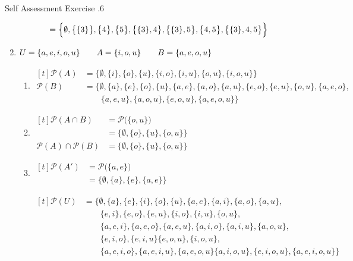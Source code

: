 \documentclass[../notes.tex]{subfiles}
\begin{document}
\begin{exercise}{Self Assessment Exercise \thechapter.6}
\begin{enumerate}
\begin{align*}
							&= \Bigl\{\emptyset, \bigl\{\{3\}\bigr\}, \bigl\{4\bigr\}, \bigl\{5\bigr\}, \bigl\{\{3\}, 4\bigr\}, \bigl\{\{3\}, 5\bigr\}, \bigl\{4, 5\bigr\}, \bigl\{\{3\}, 4, 5\bigr\}\Bigr\}
						\end{align*}
					\pagebreak
					\item \hfill $
						\begin{alignedat}[t]{3}
							U &= \{a, e, i, o, u\} \qquad & A &= \{i, o, u\} \qquad & B &= \{a, e, o, u\}
						\end{alignedat} $ \hfill \phantom{4 \quad}
						\begin{enumerate}[label=(\alph*), labelsep=1em]
							\item $
								\begin{aligned}[t]
									\mathcal{P}(A) &= \bigl\{\emptyset, \{i\}, \{o\}, \{u\}, \{i, o\}, \{i, u\}, \{o, u\}, \{i, o, u\}\bigr\}\\
									\mathcal{P}(B) &= \bigl\{\emptyset, \{a\}, \{e\}, \{o\}, \{u\}, \{a, e\}, \{a, o\}, \{a, u\}, \{e, o\}, \{e, u\}, \{o, u\}, \{a, e, o\},\\
									& \qquad \{a, e, u\}, \{a, o, u\}, \{e, o, u\}, \{a, e, o, u\}\bigr\}
								\end{aligned} $
							\item $
								\begin{aligned}[t]
									\mathcal{P}(A \cap B) &= \mathcal{P}\bigl(\{o, u\}\bigr)\\
									&= \bigl\{\emptyset, \{o\}, \{u\}, \{o, u\}\bigr\}\\
									\mathcal{P}(A) \cap \mathcal{P}(B) &= \bigl\{\emptyset, \{o\}, \{u\}, \{o, u\}\bigr\}
								\end{aligned} $
							\item $
								\begin{aligned}[t]
									\mathcal{P}\left(A'\right) &= \mathcal{P}\bigl(\{a, e\}\bigr)\\
									&= \bigl\{\emptyset, \{a\}, \{e\}, \{a, e\}\bigr\}
								\end{aligned}$

								$\begin{aligned}[t]
									\mathcal{P}(U) &= \bigl\{\emptyset, \{a\}, \{e\}, \{i\}, \{o\}, \{u\}, \{a, e\}, \{a, i\}, \{a, o\}, \{a, u\},\\
									& \qquad \{e, i\}, \{e, o\}, \{e, u\}, \{i, o\}, \{i, u\}, \{o, u\},\\
									& \qquad \{a, e, i\}, \{a, e, o\}, \{a, e, u\}, \{a, i, o\}, \{a, i, u\}, \{a, o, u\},\\
									& \qquad \{e, i, o\}, \{e, i, u\} \{e, o, u\}, \{i, o, u\},\\
									& \qquad \{a, e, i, o\}, \{a, e, i, u\}, \{a, e, o, u\} \{a, i, o, u\}, \{e, i, o, u\}, \{a, e, i, o, u\}\bigr\}
								\end{aligned} $


\end{enumerate}
\end{enumerate}
\end{exercise}
\end{document}
